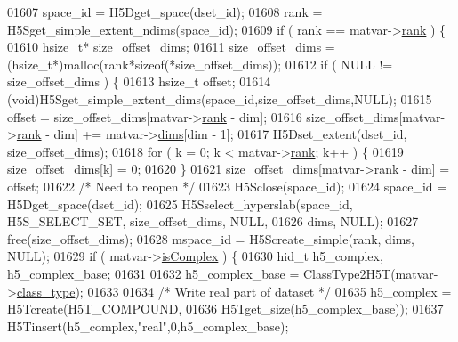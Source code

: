 \begin{DoxyCode}
{{01607             space\_id = H5Dget\_space(dset\_id);
01608             rank = H5Sget\_simple\_extent\_ndims(space\_id);
01609             \textcolor{keywordflow}{if} ( rank == matvar->\hyperlink{group___m_a_t_a84ba70c96ded13cc555fa75b768d9921}{rank} ) \{
01610                 hsize\_t* size\_offset\_dims;
01611                 size\_offset\_dims = (hsize\_t*)malloc(rank*\textcolor{keyword}{sizeof}(*size\_offset\_dims));
01612                 \textcolor{keywordflow}{if} ( NULL != size\_offset\_dims ) \{
01613                     hsize\_t offset;
01614                     (void)H5Sget\_simple\_extent\_dims(space\_id,size\_offset\_dims,NULL);
01615                     offset = size\_offset\_dims[matvar->\hyperlink{group___m_a_t_a84ba70c96ded13cc555fa75b768d9921}{rank} - dim];
01616                     size\_offset\_dims[matvar->\hyperlink{group___m_a_t_a84ba70c96ded13cc555fa75b768d9921}{rank} - dim] += matvar->\hyperlink{group___m_a_t_a8e01234e1c862ce3472bb37f5a09b92c}{dims}[dim - 1];
01617                     H5Dset\_extent(dset\_id, size\_offset\_dims);
01618                     \textcolor{keywordflow}{for} ( k = 0; k < matvar->\hyperlink{group___m_a_t_a84ba70c96ded13cc555fa75b768d9921}{rank}; k++ ) \{
01619                         size\_offset\_dims[k] = 0;
01620                     \}
01621                     size\_offset\_dims[matvar->\hyperlink{group___m_a_t_a84ba70c96ded13cc555fa75b768d9921}{rank} - dim] = offset;
01622                     \textcolor{comment}{/* Need to reopen */}
01623                     H5Sclose(space\_id);
01624                     space\_id = H5Dget\_space(dset\_id);
01625                     H5Sselect\_hyperslab(space\_id, H5S\_SELECT\_SET, size\_offset\_dims, NULL,
01626                                         dims, NULL);
01627                     free(size\_offset\_dims);
01628                     mspace\_id = H5Screate\_simple(rank, dims, NULL);
01629                     \textcolor{keywordflow}{if} ( matvar->\hyperlink{group___m_a_t_aeb03b3a69f108dc05470b00443a43739}{isComplex} ) \{
01630                         hid\_t h5\_complex, h5\_complex\_base;
01631 
01632                         h5\_complex\_base = ClassType2H5T(matvar->\hyperlink{group___m_a_t_aff13035bf3265dd7d9425e5d40c839d4}{class\_type});
01633 
01634                         \textcolor{comment}{/* Write real part of dataset */}
01635                         h5\_complex = H5Tcreate(H5T\_COMPOUND,
01636                                                H5Tget\_size(h5\_complex\_base));
01637                         H5Tinsert(h5\_complex,\textcolor{stringliteral}{"real"},0,h5\_complex\_base);
}}
\end{DoxyCode}
